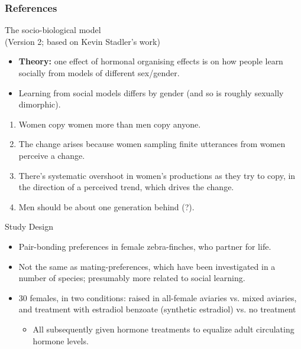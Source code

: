 \documentclass[hyperref={pdfpagelabels=false}]{beamer}
\begin{document}
\begin{frame}[allowframebreaks]
\frametitle{References}
\newcommand*{\newblock}{natbib}


\end{frame}

\begin{frame}{The socio-biological model \\\small{(Version 2; based on Kevin Stadler's work)}}
	\begin{itemize}
	\item \textbf{Theory:} one effect of hormonal organising effects is on how people learn socially from models of different sex/gender.
	\item Learning from social models differs by gender (and so is roughly sexually dimorphic).
	\end{itemize}
	\begin{enumerate}
	\item Women copy women more than men copy anyone.
	\item The change arises because women sampling finite utterances from women perceive a change.
	\item There's systematic overshoot in women's productions as they try to copy, in the direction of a perceived trend, which drives the change.
	\item Men should be about one generation behind (?).
	\end{enumerate}

\end{frame}



\begin{frame}{\citet{mansukhanietal1996}}
\begin{block}{Study Design}
\begin{itemize}
	\item Pair-bonding preferences in female zebra-finches, who partner for life.
	\item Not the same as mating-preferences, which have been investigated in a number of species; presumably more related to social learning.
	\item 30 females, in two conditions: raised in all-female aviaries vs. mixed aviaries, and treatment with estradiol benzoate (synthetic estradiol) vs. no treatment
		\begin{itemize}
		\item All subsequently given hormone treatments to equalize adult circulating hormone levels.
		\end{itemize}
\end{itemize}
\end{block}
\end{frame}
\end{document}
